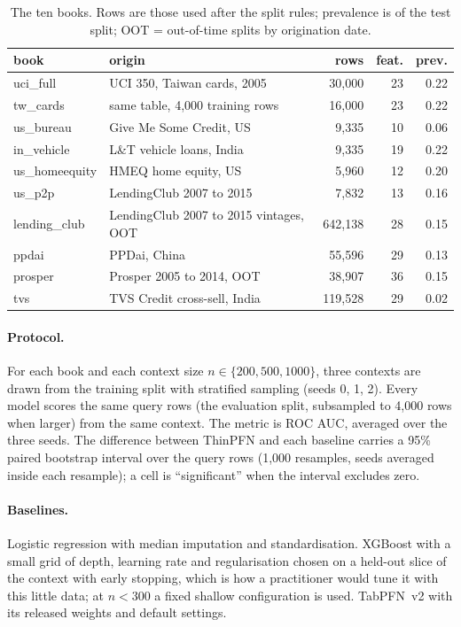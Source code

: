 \documentclass[twocolumn,10pt]{article}
\begin{document}
\begin{table}[t]
\centering\small
\caption{The ten books. Rows are those used after the split rules; prevalence is of the test split; OOT = out-of-time splits by origination date.}
\label{tab:books}
\begin{tabular}{llrrr}
\toprule
book & origin & rows & feat. & prev. \\
\midrule
uci\_full & UCI 350, Taiwan cards, 2005 & 30,000 & 23 & 0.22 \\
tw\_cards & same table, 4,000 training rows & 16,000 & 23 & 0.22 \\
us\_bureau & Give Me Some Credit, US & 9,335 & 10 & 0.06 \\
in\_vehicle & L\&T vehicle loans, India & 9,335 & 19 & 0.22 \\
us\_homeequity & HMEQ home equity, US & 5,960 & 12 & 0.20 \\
us\_p2p & LendingClub 2007 to 2015 & 7,832 & 13 & 0.16 \\
lending\_club & LendingClub 2007 to 2015 vintages, OOT & 642,138 & 28 & 0.15 \\
ppdai & PPDai, China & 55,596 & 29 & 0.13 \\
prosper & Prosper 2005 to 2014, OOT & 38,907 & 36 & 0.15 \\
tvs & TVS Credit cross-sell, India & 119,528 & 29 & 0.02 \\
\bottomrule
\end{tabular}
\end{table}

\paragraph{Protocol.} For each book and each context size $n \in \{200, 500, 1000\}$, three contexts are drawn from the
training split with stratified sampling (seeds 0, 1, 2). Every model scores the same query rows (the evaluation split,
subsampled to 4,000 rows when larger) from the same context. The metric is ROC AUC, averaged over the three seeds. The
difference between ThinPFN and each baseline carries a 95\% paired bootstrap interval over the query rows (1,000
resamples, seeds averaged inside each resample); a cell is ``significant'' when the interval excludes zero.

\paragraph{Baselines.} Logistic regression with median imputation and standardisation. XGBoost with a small grid of
depth, learning rate and regularisation chosen on a held-out slice of the context with early stopping, which is how a
practitioner would tune it with this little data; at $n < 300$ a fixed shallow configuration is used. TabPFN~v2
\citep{hollmann2025accurate} with its released weights and default settings.
\end{document}

